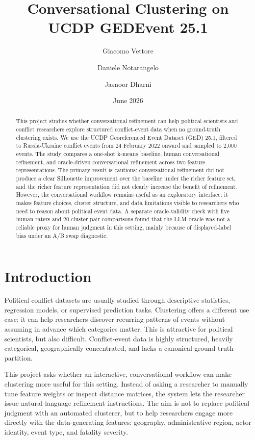 \documentclass[11pt,a4paper]{article}
\title{Conversational Clustering on UCDP GEDEvent 25.1}
\author{Giacomo Vettore \and Daniele Notarangelo \and Jasnoor Dharni}
\date{June 2026}
\begin{document}
\maketitle

\begin{abstract}
This project studies whether conversational refinement can help political scientists and conflict researchers explore structured conflict-event data when no ground-truth clustering exists. We use the UCDP Georeferenced Event Dataset (GED) 25.1, filtered to Russia-Ukraine conflict events from 24 February 2022 onward and sampled to 2,000 events. The study compares a one-shot k-means baseline, human conversational refinement, and oracle-driven conversational refinement across two feature representations. The primary result is cautious: conversational refinement did not produce a clear Silhouette improvement over the baseline under the richer feature set, and the richer feature representation did not clearly increase the benefit of refinement. However, the conversational workflow remains useful as an exploratory interface: it makes feature choices, cluster structure, and data limitations visible to researchers who need to reason about political event data. A separate oracle-validity check with five human raters and 20 cluster-pair comparisons found that the LLM oracle was not a reliable proxy for human judgment in this setting, mainly because of displayed-label bias under an A/B swap diagnostic.
\end{abstract}

\section{Introduction}

Political conflict datasets are usually studied through descriptive statistics, regression models, or supervised prediction tasks. Clustering offers a different use case: it can help researchers discover recurring patterns of events without assuming in advance which categories matter. This is attractive for political scientists, but also difficult. Conflict-event data is highly structured, heavily categorical, geographically concentrated, and lacks a canonical ground-truth partition.

This project asks whether an interactive, conversational workflow can make clustering more useful for this setting. Instead of asking a researcher to manually tune feature weights or inspect distance matrices, the system lets the researcher issue natural-language refinement instructions. The aim is not to replace political judgment with an automated clusterer, but to help researchers engage more directly with the data-generating features: geography, administrative region, actor identity, event type, and fatality severity.
\end{document}
